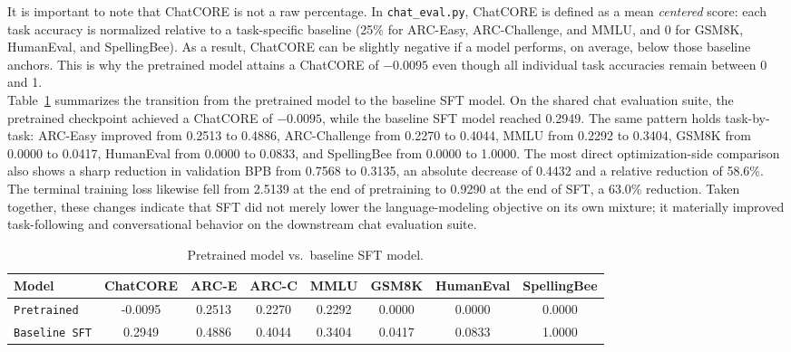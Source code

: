 \documentclass[a4paper,12pt]{article}
\begin{document}
It is important to note that ChatCORE is not a raw percentage. In \texttt{chat\_eval.py}, ChatCORE is defined as a mean \emph{centered} score: each task accuracy is normalized relative to a task-specific baseline (25\% for ARC-Easy, ARC-Challenge, and MMLU, and 0 for GSM8K, HumanEval, and SpellingBee). As a result, ChatCORE can be slightly negative if a model performs, on average, below those baseline anchors. This is why the pretrained model attains a ChatCORE of $-0.0095$ even though all individual task accuracies remain between 0 and 1.\\

Table~\ref{tab:pretrain-vs-sft} summarizes the transition from the pretrained model to the baseline SFT model. On the shared chat evaluation suite, the pretrained checkpoint achieved a ChatCORE of $-0.0095$, while the baseline SFT model reached 0.2949. The same pattern holds task-by-task: ARC-Easy improved from 0.2513 to 0.4886, ARC-Challenge from 0.2270 to 0.4044, MMLU from 0.2292 to 0.3404, GSM8K from 0.0000 to 0.0417, HumanEval from 0.0000 to 0.0833, and SpellingBee from 0.0000 to 1.0000. The most direct optimization-side comparison also shows a sharp reduction in validation BPB from 0.7568 to 0.3135, an absolute decrease of 0.4432 and a relative reduction of 58.6\%. The terminal training loss likewise fell from 2.5139 at the end of pretraining to 0.9290 at the end of SFT, a 63.0\% reduction. Taken together, these changes indicate that SFT did not merely lower the language-modeling objective on its own mixture; it materially improved task-following and conversational behavior on the downstream chat evaluation suite.

\begin{table}[ht]
    \centering
    \small
    \setlength{\tabcolsep}{4.5pt}
    \begin{tabular}{lccccccc}
    \toprule
    \textbf{Model} & ChatCORE & ARC-E & ARC-C & MMLU & GSM8K & HumanEval & SpellingBee \\
    \midrule
     \texttt{Pretrained} & -0.0095 & 0.2513 & 0.2270 & 0.2292 & 0.0000 & 0.0000 & 0.0000 \\
\texttt{Baseline SFT} & 0.2949 & 0.4886 & 0.4044 & 0.3404 & 0.0417 & 0.0833 & 1.0000 \\
    \bottomrule
    \end{tabular}
    \caption{Pretrained model vs.\ baseline SFT model.}
    \label{tab:pretrain-vs-sft}
\end{table}
\end{document}
